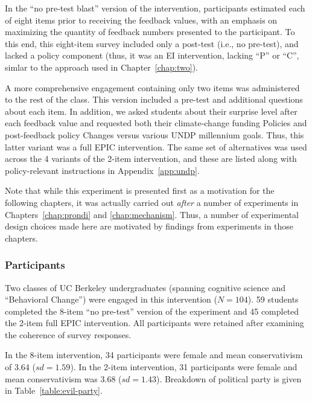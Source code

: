 In the “no pre-test blast” version of the intervention, participants estimated
each of eight items prior to receiving the feedback values, with an emphasis on
maximizing the quantity of feedback numbers presented to the participant. To
this end, this eight-item survey included only a post-test (i.e., no pre-test),
and lacked a policy component (thus, it was an EI intervention, lacking ``P'' or
``C'', simlar to the approach used in Chapter~\ref{chap:two}). 

A more comprehensive engagement containing only two items was administered to
the rest of the class. This version included a pre-test and additional questions
about each item. In addition, we asked students about their surprise level after
each feedback value and requested both their climate-change funding Policies and
post-feedback policy Changes versus various UNDP millennium goals.  Thus, this
latter variant was a full EPIC intervention. The same set of alternatives was
used across the 4 variants of the 2-item intervention, and these are listed
along with policy-relevant instructions in Appendix~\ref{app:undp}.

Note that while this experiment is presented first as a motivation for the
following chapters, it was actually carried out \emph{after} a number of
experiments in Chapters~\ref{chap:prondi} and \ref{chap:mechanism}. Thus, a
number of experimental design choices made here are motivated by findings from
experiments in those chapters.

\subsubsection{Participants}

Two classes of UC Berkeley undergraduates (spanning cognitive science and
“Behavioral Change”) were engaged in this intervention ($N=104$). 59 students
completed the 8-item “no pre-test” version of the experiment and 45 completed
the 2-item full EPIC intervention. All participants were retained after
examining the coherence of survey responses.

In the 8-item intervention, 34 participants were female and mean conservativism
of 3.64 ($sd=1.59$). In the 2-item intervention, 31 participants were female and
mean conservativism was 3.68 ($sd=1.43$). Breakdown of political party is given
in Table~\ref{table:evil-party}.

